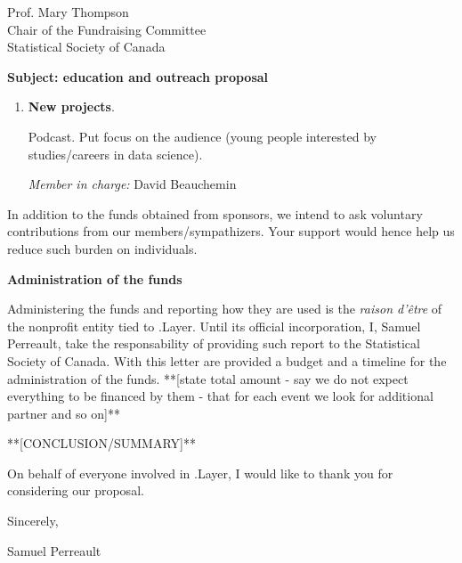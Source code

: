 \documentclass[11pt, a4paper]{letter} %
\begin{document}
\begin{letter}{
	Prof. Mary Thompson\\
	Chair of the Fundraising Committee\\
	Statistical Society of Canada
	
	\bigskip
	\textbf{Subject: education and outreach proposal}%
}
\begin{enumerate}
	\item \textbf{New projects}.
	
	\quad Podcast. Put focus on the audience (young people interested by studies/careers in data science).
	
	\bigskip
	\emph{Member in charge:} David Beauchemin
\end{enumerate}

In addition to the funds obtained from sponsors, we intend to ask voluntary contributions from our members/sympathizers. Your support would hence help us reduce such burden on individuals.

\bigskip
\noindent \textbf{Administration of the funds}

Administering the funds and reporting how they are used is the \emph{raison d'\^{e}tre} of the nonprofit entity tied to .Layer. Until its official incorporation, I, Samuel Perreault, take the responsability of providing such report to the Statistical Society of Canada. With this letter are provided a budget and a timeline for the administration of the funds. **[state total amount - say we do not expect everything to be financed by them - that for each event we look for additional partner and so on]**

\bigskip

**[CONCLUSION/SUMMARY]**



%

On behalf of everyone involved in .Layer, I would like to thank you for considering our proposal.      

\closing{Sincerely,}

\noindent Samuel Perreault


\end{letter}
\end{document}
